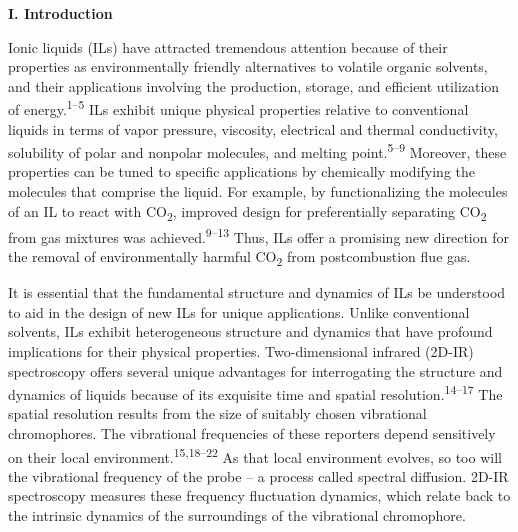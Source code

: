 \documentclass[]{article}
\begin{document}
\textbf{I. Introduction}

Ionic liquids (ILs) have attracted tremendous attention because of their properties as environmentally friendly alternatives to volatile organic solvents, and their applications involving the production, storage, and efficient utilization of energy.\textsuperscript{1--5} ILs exhibit unique physical properties relative to conventional liquids in terms of vapor pressure, viscosity, electrical and thermal conductivity, solubility of polar and nonpolar molecules, and melting point.\textsuperscript{5--9} Moreover, these properties can be tuned to specific applications by chemically modifying the molecules that comprise the liquid. For example, by functionalizing the molecules of an IL to react with CO\textsubscript{2}, improved design for preferentially separating CO\textsubscript{2} from gas mixtures was achieved.\textsuperscript{9--13} Thus, ILs offer a promising new direction for the removal of environmentally harmful CO\textsubscript{2} from postcombustion flue gas.

It is essential that the fundamental structure and dynamics of ILs be understood to aid in the design of new ILs for unique applications.  Unlike conventional solvents, ILs exhibit heterogeneous structure and dynamics that have profound implications for their physical properties.  Two-dimensional infrared (2D-IR) spectroscopy offers several unique advantages for interrogating the structure and dynamics of liquids because of its exquisite time and spatial resolution.\textsuperscript{14--17} The spatial resolution results from the size of suitably chosen vibrational chromophores. The vibrational frequencies of these reporters depend sensitively on their local environment.\textsuperscript{15,18--22} As that local environment evolves, so too will the vibrational frequency of the probe -- a process called spectral diffusion. 2D-IR spectroscopy measures these frequency fluctuation dynamics, which relate back to the intrinsic dynamics of the surroundings of the vibrational chromophore.
\end{document}
